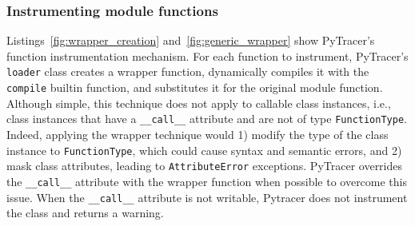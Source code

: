 \documentclass[11pt]{article}
\newcommand{\tristan}[1]{\color{orange}\textbf{From Tristan:} #1\color{black}\xspace}
\newcommand{\Yohan}[1]{\color{green!75!black}\textbf{Yohan:} #1\color{black}\xspace}
\newcommand{\pytracer}[0]{PyTracer\xspace}
\begin{document}


\subsubsection{Instrumenting module functions}

Listings~\ref{fig:wrapper_creation} and~\ref{fig:generic_wrapper} show \pytracer's function instrumentation mechanism.
For each function to instrument, \pytracer's \texttt{loader} class creates a wrapper function, dynamically compiles it with the \texttt{compile} builtin function, and substitutes it for the original module function.  Although simple, this technique does not apply to callable class instances, i.e., class instances that have a \texttt{\_\_call\_\_} attribute and are not of type \texttt{FunctionType}. Indeed, applying the wrapper technique would 1) modify the type of the class instance to \texttt{FunctionType}, which could cause syntax and semantic errors, and 2) mask class attributes, leading to \texttt{AttributeError} exceptions.
\pytracer overrides the \texttt{\_\_call\_\_} attribute with the wrapper function when possible to overcome this issue.
When the \texttt{\_\_call\_\_} attribute is not writable,  Pytracer does not instrument the class and returns a warning. 
\end{document}
